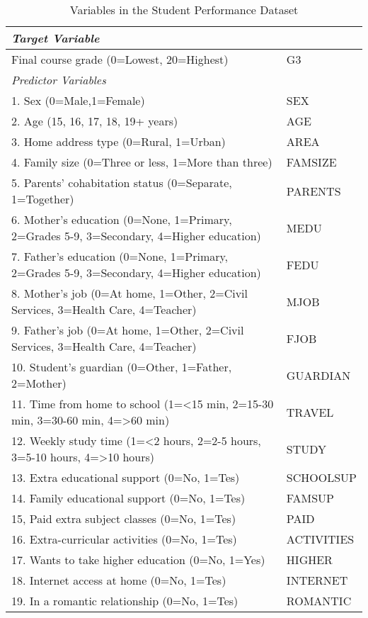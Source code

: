 \documentclass[sigconf]{acmart}
\begin{document}
\begin{table*}[ht]
  \caption{Variables in the Student Performance Dataset \cite{cortez08}}
  \label{tab:freq}
  \begin{tabular}{ll}
    \toprule
    \textit{Target Variable} &  \\
    \midrule
    Final course grade (0=Lowest, 20=Highest) & G3 \\
    \midrule
    \textit{Predictor Variables} &    \\
    \midrule
    1. Sex (0=Male,1=Female) & SEX  \\  
    2. Age (15, 16, 17, 18, 19+ years) & AGE  \\
    3. Home address type (0=Rural, 1=Urban) & AREA  \\
    4. Family size (0=Three or less, 1=More than three) & FAMSIZE  \\
    5. Parents' cohabitation status (0=Separate, 1=Together) & PARENTS  \\ 
    6. Mother's education (0=None, 1=Primary, 2=Grades 5-9,  3=Secondary, 4=Higher education) & MEDU  \\
    7. Father's education (0=None, 1=Primary, 2=Grades 5-9,  3=Secondary, 4=Higher education) & FEDU  \\
    8. Mother's job (0=At home, 1=Other, 2=Civil Services, 3=Health Care, 4=Teacher) & MJOB  \\
    9. Father's job (0=At home, 1=Other, 2=Civil Services, 3=Health Care, 4=Teacher) & FJOB  \\
    10. Student's guardian (0=Other, 1=Father, 2=Mother) & GUARDIAN  \\
    11. Time from home to school (1=<15 min, 2=15-30 min, 3=30-60 min, 4=>60 min) & TRAVEL  \\
    12. Weekly study time (1=<2 hours, 2=2-5 hours, 3=5-10 hours, 4=>10 hours) & STUDY  \\
    13. Extra educational support (0=No, 1=Tes) & SCHOOLSUP  \\
    14. Family educational support (0=No, 1=Tes) & FAMSUP  \\
    15, Paid extra subject classes (0=No, 1=Tes) & PAID  \\
    16. Extra-curricular activities (0=No, 1=Tes) & ACTIVITIES  \\
    17. Wants to take higher education (0=No, 1=Yes) & HIGHER  \\
    18. Internet access at home (0=No, 1=Tes) & INTERNET  \\
    19. In a romantic relationship (0=No, 1=Tes) & ROMANTIC  \\

\end{tabular}
\end{table*}
\end{document}
